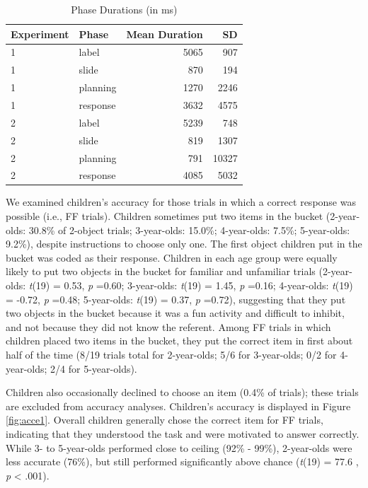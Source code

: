 \documentclass[english,,man]{apa6}
\begin{document}
\begin{table}[b]
\centering
\begin{tabular}{llrr}
  \hline
Experiment & Phase & Mean Duration & SD \\ 
  \hline
1 & label & 5065 & 907 \\ 
  1 & slide & 870 & 194 \\ 
  1 & planning & 1270 & 2246 \\ 
  1 & response & 3632 & 4575 \\ 
   \hline
2 & label & 5239 & 748 \\ 
  2 & slide & 819 & 1307 \\ 
  2 & planning & 791 & 10327 \\ 
  2 & response & 4085 & 5032 \\ 
   \hline
\end{tabular}
\caption{Phase Durations (in ms)} 
\label{tab:phases}
\end{table}

We examined children's accuracy for those trials in which a correct
response was possible (i.e., FF trials). Children sometimes put two
items in the bucket (2-year-olds: 30.8\% of 2-object trials;
3-year-olds: 15.0\%; 4-year-olds: 7.5\%; 5-year-olds: 9.2\%), despite
instructions to choose only one. The first object children put in the
bucket was coded as their response. Children in each age group were
equally likely to put two objects in the bucket for familiar and
unfamiliar trials (2-year-olds: \emph{t}(19) = 0.53, \emph{p} =0.60;
3-year-olds: \emph{t}(19) = 1.45, \emph{p} =0.16; 4-year-olds:
\emph{t}(19) = -0.72, \emph{p} =0.48; 5-year-olds: \emph{t}(19) = 0.37,
\emph{p} =0.72), suggesting that they put two objects in the bucket
because it was a fun activity and difficult to inhibit, and not because
they did not know the referent. Among FF trials in which children placed
two items in the bucket, they put the correct item in first about half
of the time (8/19 trials total for 2-year-olds; 5/6 for 3-year-olds; 0/2
for 4-year-olds; 2/4 for 5-year-olds).

Children also occasionally declined to choose an item (0.4\% of trials);
these trials are excluded from accuracy analyses. Children's accuracy is
displayed in Figure \ref{fig:acce1}. Overall children generally chose
the correct item for FF trials, indicating that they understood the task
and were motivated to answer correctly. While 3- to 5-year-olds
performed close to ceiling (92\% - 99\%), 2-year-olds were less accurate
(76\%), but still performed significantly above chance (\emph{t}(19) =
77.6 , \emph{p} \textless{} .001).
\end{document}
